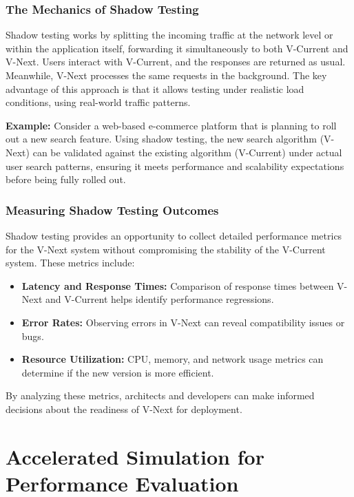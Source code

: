 \subsubsection{The Mechanics of Shadow Testing}

Shadow testing works by splitting the incoming traffic at the network level or within the application itself, forwarding it simultaneously to both V-Current and V-Next. Users interact with V-Current, and the responses are returned as usual. Meanwhile, V-Next processes the same requests in the background. The key advantage of this approach is that it allows testing under realistic load conditions, using real-world traffic patterns.

\textbf{Example:} Consider a web-based e-commerce platform that is planning to roll out a new search feature. Using shadow testing, the new search algorithm (V-Next) can be validated against the existing algorithm (V-Current) under actual user search patterns, ensuring it meets performance and scalability expectations before being fully rolled out.

\subsubsection{Measuring Shadow Testing Outcomes}

Shadow testing provides an opportunity to collect detailed performance metrics for the V-Next system without compromising the stability of the V-Current system. These metrics include:

\begin{itemize}
    \item \textbf{Latency and Response Times:} Comparison of response times between V-Next and V-Current helps identify performance regressions.
    \item \textbf{Error Rates:} Observing errors in V-Next can reveal compatibility issues or bugs.
    \item \textbf{Resource Utilization:} CPU, memory, and network usage metrics can determine if the new version is more efficient.
\end{itemize}

By analyzing these metrics, architects and developers can make informed decisions about the readiness of V-Next for deployment.

\section{Accelerated Simulation for Performance Evaluation}


